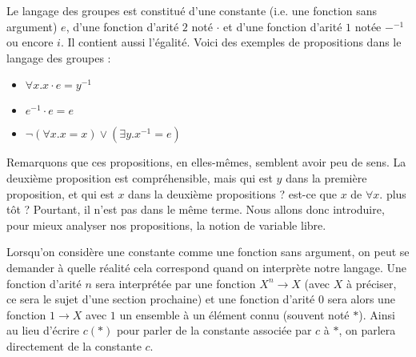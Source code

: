 \begin{expl}\label{expl:langagegrp}
    Le langage des groupes est constitué d'une constante (i.e. une fonction sans argument) $e$, d'une fonction d'arité $2$ noté $\cdot$ et d'une fonction d'arité $1$ notée $-^{-1}$ ou encore $i$. Il contient aussi l'égalité. Voici des exemples de propositions dans le langage des groupes :
    \begin{itemize}[label=$\bullet$]
        \item $\forall x. x\cdot e = y^{-1}$
        \item $e^{-1}\cdot e = e$
        \item $\lnot(\forall x. x=x)\lor (\exists y. x^{-1}=e)$
    \end{itemize}
\end{expl}

Remarquons que ces propositions, en elles-mêmes, semblent avoir peu de sens. La deuxième proposition est compréhensible, mais qui est $y$ dans la première proposition, et qui est $x$ dans la deuxième propositions ? est-ce que $x$ de $\forall x.$ plus tôt ? Pourtant, il n'est pas dans le même terme. Nous allons donc introduire, pour mieux analyser nos propositions, la notion de variable libre.

\begin{rmk}
    Lorsqu'on considère une constante comme une fonction sans argument, on peut se demander à quelle réalité cela correspond quand on interprète notre langage. Une fonction d'arité $n$ sera interprétée par une fonction $X^n \to X$ (avec $X$ à préciser, ce sera le sujet d'une section prochaine) et une fonction d'arité $0$ sera alors une fonction $1 \to X$ avec $1$ un ensemble à un élément connu (souvent noté $*$). Ainsi au lieu d'écrire $c(*)$ pour parler de la constante associée par $c$ à $*$, on parlera directement de la constante $c$.
\end{rmk}

